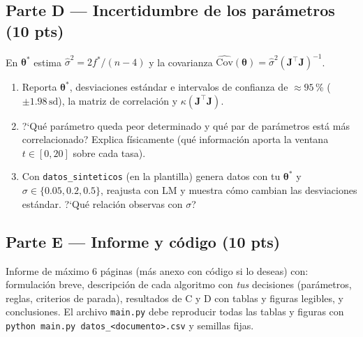 \documentclass[11pt,letterpaper]{article}
\newcommand{\tht}{\boldsymbol{\theta}}
\newcommand{\Jm}{\mathbf{J}}
\begin{document}
\subsection*{Parte D --- Incertidumbre de los par\'ametros (10 pts)}
En $\tht^\ast$ estima $\hat\sigma^2=2f^\ast/(n-4)$ y la covarianza $\widehat{\mathrm{Cov}}(\tht)=\hat\sigma^2(\Jm^\top\Jm)^{-1}$.
\begin{enumerate}[label=D\arabic*.]
\item Reporta $\tht^\ast$, desviaciones est\'andar e intervalos de confianza de $\approx95$\,\%
($\pm1.98\,\mathrm{sd}$), la matriz de correlaci\'on y $\kappa(\Jm^\top\Jm)$.
\item ?`Qu\'e par\'ametro queda peor determinado y qu\'e par de par\'ametros est\'a m\'as correlacionado? Explica
f\'isicamente (qu\'e informaci\'on aporta la ventana $t\in[0,20]$ sobre cada tasa).
\item Con \texttt{datos\_sinteticos} (en la plantilla) genera datos con tu $\tht^\ast$ y $\sigma\in\{0.05,0.2,0.5\}$,
reajusta con LM y muestra c\'omo cambian las desviaciones est\'andar. ?`Qu\'e relaci\'on observas con $\sigma$?
\end{enumerate}

\subsection*{Parte E --- Informe y c\'odigo (10 pts)}
Informe de m\'aximo 6 p\'aginas (m\'as anexo con c\'odigo si lo deseas) con: formulaci\'on breve, descripci\'on de
cada algoritmo con \emph{tus} decisiones (par\'ametros, reglas, criterios de parada), resultados de C y D con tablas
y figuras legibles, y conclusiones. El archivo \texttt{main.py} debe reproducir todas las tablas y figuras con
\texttt{python main.py datos\_<documento>.csv} y semillas fijas.
\end{document}
